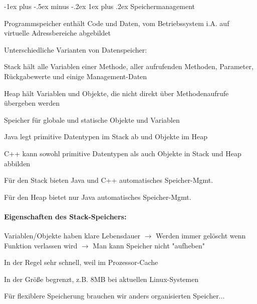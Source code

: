 \documentclass[10pt]{article}
\makeatletter
\renewcommand{\subsubsection}{\@startsection{subsubsection}{3}{0mm}%
                                {-1ex plus -.5ex minus -.2ex}%
                                {1ex plus .2ex}%
                                {\normalfont\small\bfseries}}
\makeatother
\begin{document}
\subsubsection{Speichermanagement}
\begin{itemize*}
  \item Programmspeicher enthält Code und Daten, vom Betriebssystem i.A. auf virtuelle Adressbereiche abgebildet
  \item Unterschiedliche Varianten von Datenspeicher:
  \begin{itemize*}
    \item Stack hält alle Variablen einer Methode, aller aufrufenden Methoden, Parameter, Rückgabewerte und einige Management-Daten
    \item Heap hält Variablen und Objekte, die nicht direkt über Methodenaufrufe übergeben werden
    \item Speicher für globale und statische Objekte und Variablen
  \end{itemize*}
  \item Java legt primitive Datentypen im Stack ab und Objekte im Heap
  \item C++ kann sowohl primitive Datentypen als auch Objekte in Stack und Heap abbilden
  \item Für den Stack bieten Java und C++ automatisches Speicher-Mgmt.
  \item Für den Heap bietet nur Java automatisches Speicher-Mgmt.
\end{itemize*}

\paragraph{Eigenschaften des Stack-Speichers:}
\begin{itemize*}
  \item Variablen/Objekte haben klare Lebensdauer $\rightarrow$ Werden immer gelöscht wenn Funktion verlassen wird  $\rightarrow$ Man kann Speicher nicht "aufheben"
  \item In der Regel sehr schnell, weil im Prozessor-Cache
  \item In der Größe begrenzt, z.B. 8MB bei aktuellen Linux-Systemen
  \item Für flexiblere Speicherung brauchen wir anders organisierten Speicher...
\end{itemize*}
\end{document}
